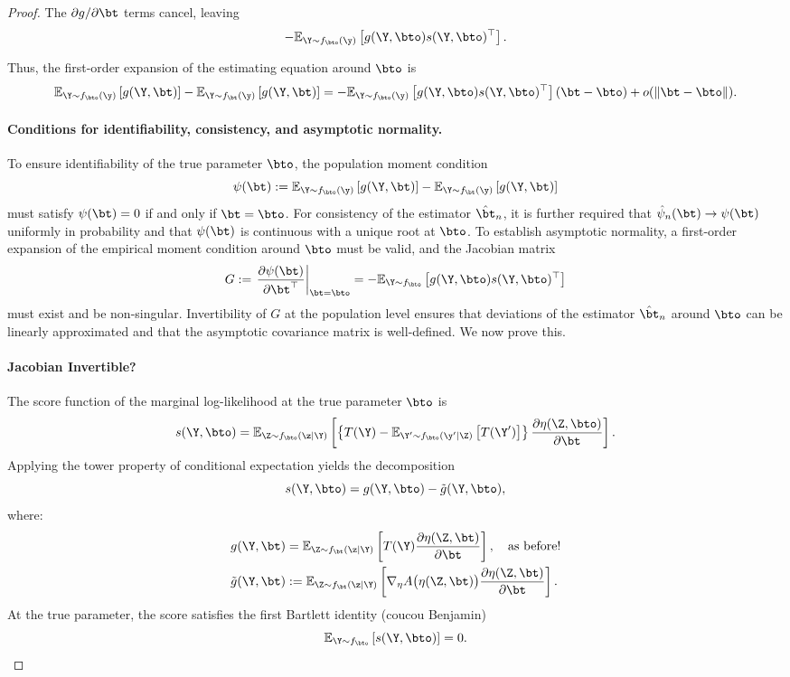 \begin{proof}
The \( \partial g / \partial \bt \) terms cancel, leaving
\[
- \mathbb{E}_{\Y \sim f_{\bto}(\y)} \left[ g(\Y, \bto) s(\Y, \bto)^\top \right].
\]

Thus, the first-order expansion of the estimating equation around \( \bto \) is
\[
\mathbb{E}_{\Y \sim f_{\bto}(\y)} \left[ g(\Y, \bt) \right]
-
\mathbb{E}_{\Y \sim f_{\bt}(\y)} \left[ g(\Y, \bt) \right]
=
- \mathbb{E}_{\Y \sim f_{\bto}(\y)} \left[ g(\Y, \bto) s(\Y, \bto)^\top \right] (\bt - \bto)
+ o(\| \bt - \bto \|).
\]

\paragraph{Conditions for identifiability, consistency, and asymptotic normality.}
To ensure identifiability of the true parameter \( \bto \), the population moment condition
\[
\psi(\bt) := \mathbb{E}_{\Y \sim f_{\bto}(\y)} \left[ g(\Y, \bt) \right] - \mathbb{E}_{\Y \sim f_{\bt}(\y)} \left[ g(\Y, \bt) \right]
\]
must satisfy \( \psi(\bt) = 0 \) if and only if \( \bt = \bto \). For consistency of the estimator \( \hat\bt_n \), it is further required that \( \hat\psi_n(\bt) \to \psi(\bt) \) uniformly in probability and that \( \psi(\bt) \) is continuous with a unique root at \( \bto \). To establish asymptotic normality, a first-order expansion of the empirical moment condition around \( \bto \) must be valid, and the Jacobian matrix
\[
G := \left. \frac{\partial \psi(\bt)}{\partial \bt^\top} \right|_{\bt = \bto} = - \mathbb{E}_{\Y \sim f_{\bto}} \left[ g(\Y, \bto) s(\Y, \bto)^\top \right]
\]
must exist and be non-singular. Invertibility of \( G \) at the population level ensures that deviations of the estimator \( \hat\bt_n \) around \( \bto \) can be linearly approximated and that the asymptotic covariance matrix is well-defined. We now prove this.

\paragraph{Jacobian Invertible?}
The score function of the marginal log-likelihood at the true parameter \( \bto \) is
\[
s(\Y, \bto) =
\mathbb{E}_{\Z \sim f_{\bto}(\z \mid \Y)} \left[
\left\{
T(\Y) - \mathbb{E}_{\Y' \sim f_{\bto}(\y' \mid \Z)} \left[ T(\Y') \right]
\right\}
\frac{\partial \eta(\Z, \bto)}{\partial \bt}
\right].
\]
Applying the tower property of conditional expectation yields the decomposition
\[
s(\Y, \bto)
= g(\Y, \bto) - \tilde{g}(\Y, \bto),
\]
where:
\begin{align*}
g(\Y, \bt) &= \mathbb{E}_{\Z \sim f_{\bt}(\z \mid \Y)} \left[ T(\Y) \frac{\partial \eta(\Z, \bt)}{\partial \bt} \right], \quad \text{as before!} \\
\tilde{g}(\Y, \bt) &:= \mathbb{E}_{\Z \sim f_{\bt}(\z \mid \Y)} \left[ \nabla_\eta A\bigl(\eta(\Z, \bt)\bigr) \frac{\partial \eta(\Z, \bt)}{\partial \bt} \right].
\end{align*}
At the true parameter, the score satisfies the first Bartlett identity (coucou Benjamin)
\[
\mathbb{E}_{\Y \sim f_{\bto}} \left[ s(\Y, \bto) \right] = 0.
\]


\end{proof}
